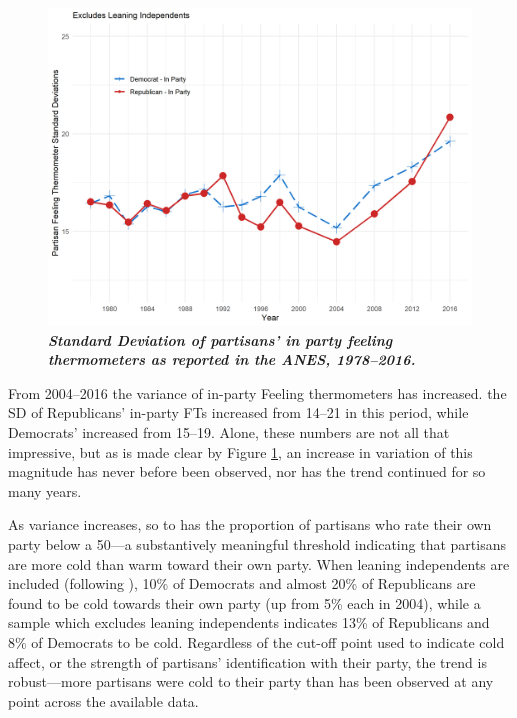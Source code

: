 \documentclass[12pt]{paper}
\begin{document}
\begin{figure}
\centering
\includegraphics[width=.75\textwidth]{cdf-sd.png}
\caption{\label{fig:cdf-sd} \textit{\textbf{Standard Deviation of partisans' in party feeling thermometers as reported in the ANES, 1978--2016.} %
}}
\end{figure}

From 2004--2016 the variance of in-party Feeling thermometers has increased. the SD of Republicans' in-party FTs increased from 14--21 in this period, while Democrats' increased from 15--19. Alone, these numbers are not all that impressive, but as is made clear by Figure \ref{fig:cdf-sd}, an increase in variation of this magnitude has never before been observed, nor has the trend continued for so many years.

As variance increases, so to has the proportion of partisans who rate their own party below a 50---a substantively meaningful threshold indicating that partisans are more cold than warm toward their own party. When leaning independents are included (following \citep{klar2016independent}), 10\% of Democrats and almost 20\% of Republicans are found to be cold towards their own party (up from 5\% each in 2004), while a sample which excludes leaning independents indicates 13\% of Republicans and 8\% of Democrats to be cold. Regardless of the cut-off point used to indicate cold affect, or the strength of partisans' identification with their party, the trend is robust---more partisans were cold to their party than has been observed at any point across the available data.
\end{document}
